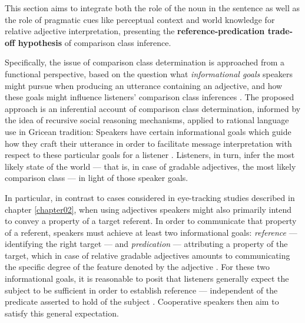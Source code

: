 This section aims to integrate both the role of the noun in the sentence as well as the role of pragmatic cues like perceptual context and world knowledge for relative adjective interpretation, presenting the \textbf{reference-predication trade-off hypothesis} of comparison class inference. 

Specifically, the issue of comparison class determination is approached from a functional perspective, based on the question what \emph{informational goals} speakers might pursue when producing an utterance containing an adjective, and how these goals might influence listeners’ comparison class inferences \parencite{tessler2020}.
The proposed approach is an inferential account of comparison class determination, informed by the idea of recursive social reasoning mechanisms, applied to rational language use in Gricean tradition: Speakers have certain informational goals which guide how they craft their utterance in order to facilitate message interpretation with respect to these particular goals for a listener \parencite{goodman2016}. Listeners, in turn, infer the most likely state of the world --- that is, in case of gradable adjectives, the most likely comparison class --- in light of those speaker goals. 

In particular, in contrast to cases considered in eye-tracking studies described in chapter \ref{chapter02},  when using adjectives speakers might also primarily intend to convey a property of a target referent. In order to communicate that property of a referent, speakers must achieve at least two informational goals: \textit{reference} --- identifying the right target --- and \textit{predication} --- attributing a property of the target, which in case of relative gradable adjectives amounts to communicating the specific degree of the feature denoted by the adjective \parencite{Reboul2001, Kennedy2007}.  
For these two informational goals, it is reasonable to posit that listeners generally expect the subject to be sufficient in order to establish reference --- independent of the predicate asserted to hold of the subject \parencite{Reboul2001, syrett2010meaning, searle1969speech}. Cooperative speakers then aim to satisfy this general expectation.

